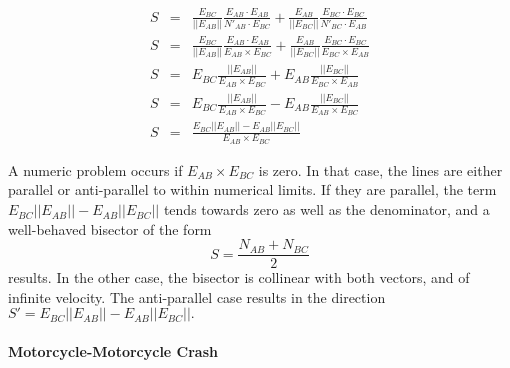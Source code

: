 \documentclass[12pt,a4paper,oneside,openany]{article}
\begin{document}
\begin{eqnarray*}
S &=& \frac{E_{BC}}{|| E_{AB} ||} \frac{E_{AB} \cdot E_{AB}}{N'_{AB} \cdot E_{BC}} +  \frac{E_{AB}}{|| E_{BC} ||} \frac{E_{BC} \cdot E_{BC}}{N'_{BC} \cdot E_{AB}} \\
S &=& \frac{E_{BC}}{|| E_{AB} ||} \frac{E_{AB} \cdot E_{AB}}{E_{AB} \times E_{BC}} +  \frac{E_{AB}}{|| E_{BC} ||} \frac{E_{BC} \cdot E_{BC}}{E_{BC} \times E_{AB}} \\
S &=& E_{BC} \frac{|| E_{AB} ||}{E_{AB} \times E_{BC}} +  E_{AB} \frac{|| E_{BC} ||}{E_{BC} \times E_{AB}} \\
S &=& E_{BC} \frac{|| E_{AB} ||}{E_{AB} \times E_{BC}} - E_{AB} \frac{|| E_{BC} ||}{E_{AB} \times E_{BC}} \\
S &=& \frac{E_{BC}|| E_{AB} || - E_{AB} || E_{BC} ||}{E_{AB} \times E_{BC}}
\end{eqnarray*}

A numeric problem occurs if $E_{AB} \times E_{BC}$ is zero. In that case, the lines are either parallel or anti-parallel to within numerical limits. If they are parallel, the term $E_{BC}|| E_{AB} || - E_{AB} || E_{BC} ||$ tends towards zero as well as the denominator, and a well-behaved bisector of the form
$$ S = \frac{N_{AB} + N_{BC}}{2}$$
results. In the other case, the bisector is collinear with both vectors, and of infinite velocity. The anti-parallel case results in the direction $ S' = E_{BC}|| E_{AB} || - E_{AB} || E_{BC} ||.$

\paragraph{Motorcycle-Motorcycle Crash}
\end{document}
